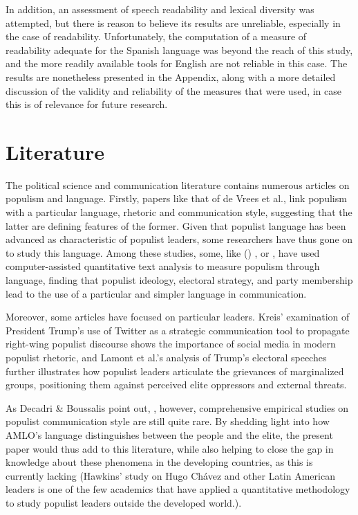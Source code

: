 \documentclass[]{article}
\begin{document}
In addition, an assessment of speech readability and lexical diversity was attempted, but there is reason to believe its results are unreliable, especially in the case of readability. Unfortunately, the computation of a measure of readability adequate for the Spanish language was beyond the reach of this study, and the more readily available tools for English are not reliable in this case. The results are nonetheless presented in the Appendix, along with a more detailed discussion of the validity and reliability of the measures that were used, in case this is of relevance for future research. 

\section{Literature}

The political science and communication literature contains numerous articles on populism and language. Firstly, papers like that of de Vrees et al., \cite{de_vreese_populism_2018} link populism with a particular language, rhetoric and communication style, suggesting that the latter are defining features of the former. Given that populist language has been advanced as characteristic of populist leaders, some researchers have thus gone on to study this language. Among these studies, some, like (\cite{decadri_populism_2020}) , or \cite{rooduijn_measuring_2011}, have used computer-assisted quantitative text analysis to measure populism through language, finding that populist ideology, electoral strategy, and party membership lead to the use of a particular and simpler language in communication. 

Moreover, some articles have focused on particular leaders. Kreis' \cite{kreis_tweet_2017} examination of President Trump's use of Twitter as a strategic communication tool to propagate right-wing populist discourse shows the importance of social media in modern populist rhetoric, and Lamont et al.'s \cite{lamont_trumps_2017} analysis of Trump's electoral speeches further illustrates how populist leaders articulate the grievances of marginalized groups, positioning them against perceived elite oppressors and external threats.

As Decadri \& Boussalis point out, \cite{decadri_populism_2020}, however, comprehensive empirical studies on populist communication style are still quite rare. By shedding light into how AMLO's language distinguishes between the people and the elite, the present paper would thus add to this literature, while also helping to close the gap in knowledge about these phenomena in the developing countries, as this is currently lacking (Hawkins' \cite{hawkins_is_2009} study on Hugo Chávez and other Latin American leaders is one of the few academics that have applied a quantitative methodology to study populist leaders outside the developed world.). 
\end{document}
